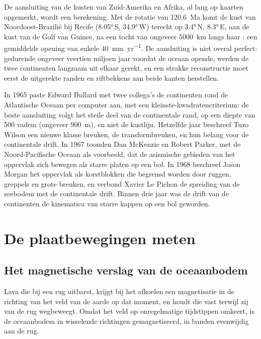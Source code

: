 De aansluiting van de kusten van Zuid-Amerika en Afrika, al lang op kaarten opgemerkt, wordt een berekening. Met de rotatie van \qty{120.6}{Ma} komt de kust van Noordoost-Brazilië bij Recife (\ang{8.05}\,S, \ang{34.9}\,W) terecht op \ang{3.4}\,N, \ang{8.3}\,E, aan de kust van de Golf van Guinee, na een tocht van ongeveer \qty{5000}{km} langs haar : een gemiddelde opening van enkele \qty{40}{mm.yr^{-1}}. De aansluiting is niet overal perfect: gedurende ongeveer veertien miljoen jaar voordat de oceaan opende, werden de twee continenten langzaam uit elkaar gerekt, en een strakke reconstructie moet eerst de uitgerekte randen en riftbekkens aan beide kanten herstellen.

\begin{history}
In 1965 paste Edward Bullard met twee collega's de continenten rond de Atlantische Oceaan per computer aan, met een kleinste-kwadratencriterium: de beste aansluiting volgt het steile deel van de continentale rand, op een diepte van 500 vadem (ongeveer \qty{900}{m}), en niet de kustlijn. Hetzelfde jaar beschreef Tuzo Wilson een nieuwe klasse breuken, de transformbreuken, en hun belang voor de continentale drift. In 1967 toonden Dan McKenzie en Robert Parker, met de Noord-Pacifische Oceaan als voorbeeld, dat de asismische gebieden van het oppervlak zich bewegen als starre platen op een bol. In 1968 beschreef Jason Morgan het oppervlak als korstblokken die begrensd worden door ruggen, greppels en grote breuken, en verbond Xavier Le Pichon de spreiding van de zeebodem met de continentale drift. Binnen drie jaar was de drift van de continenten de kinematica van starre kappen op een bol geworden.
\end{history}

\section{De plaatbewegingen meten}

\subsection*{Het magnetische verslag van de oceaanbodem}

Lava die bij een rug uitbarst, krijgt bij het afkoelen een magnetisatie in de richting van het veld van de aarde op dat moment, en houdt die vast terwijl zij van de rug wegbeweegt. Omdat het veld op onregelmatige tijdstippen omkeert, is de oceaanbodem in wisselende richtingen gemagnetiseerd, in banden evenwijdig aan de rug.

